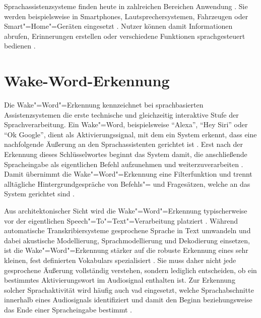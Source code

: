 Sprachassistenzsysteme finden heute in zahlreichen Bereichen Anwendung \autocite{speechtoTextTexttoSpeechRecognition}. Sie werden beispielsweise in Smartphones, Lautsprechersystemen, Fahrzeugen oder Smart"=Home"=Geräten eingesetzt \autocite{voiceassistantIntroduction}. Nutzer können damit Informationen abrufen, Erinnerungen erstellen oder verschiedene Funktionen sprachgesteuert bedienen \autocite{voiceassistantIntroduction}.


\section{Wake-Word-Erkennung}
\label{sec:Wake-Word-Erkennung}
Die Wake"=Word"=Erkennung kennzeichnet bei sprachbasierten Assistenzsystemen die erste technische und gleichzeitig interaktive Stufe der Sprachverarbeitung. Ein Wake"=Word, beispielsweise \enquote{Alexa}, \enquote{Hey Siri} oder \enquote{Ok Google}, dient als Aktivierungssignal, mit dem ein System erkennt, dass eine nachfolgende Äußerung an den Sprachassistenten gerichtet ist \autocite{tiredWakeWords}. Erst nach der Erkennung dieses Schlüsselwortes beginnt das System damit, die anschließende Spracheingabe als eigentlichen Befehl aufzunehmen und weiterzuverarbeiten \autocite{speechtoTextTexttoSpeechRecognition}. Damit übernimmt die Wake"=Word"=Erkennung eine Filterfunktion und trennt alltägliche Hintergrundgespräche von Befehls"= und Fragesätzen, welche an das System gerichtet sind \autocite{tiredWakeWords}.

Aus architektonischer Sicht wird die Wake"=Word"=Erkennung typischerweise vor der eigentlichen Speech"=To"=Text"=Verarbeitung platziert \autocite{speechtoTextTexttoSpeechRecognition}. Während automatische Transkribiersysteme gesprochene Sprache in Text umwandeln und dabei akustische Modellierung, Sprachmodellierung und Dekodierung einsetzen, ist die Wake"=Word"=Erkennung stärker auf die robuste Erkennung eines sehr kleinen, fest definierten Vokabulars spezialisiert  \autocite{tiredWakeWords,speechtoTextTexttoSpeechRecognition}. Sie muss daher nicht jede gesprochene Äußerung vollständig verstehen, sondern lediglich entscheiden, ob ein bestimmtes Aktivierungswort im Audiosignal enthalten ist. Zur Erkennung solcher Sprachaktivität wird häufig auch \gls{vad} eingesetzt, welche Sprachabschnitte innerhalb eines Audiosignals identifiziert und damit den Beginn beziehungsweise das Ende einer Spracheingabe bestimmt \autocite{tiredWakeWords}.


